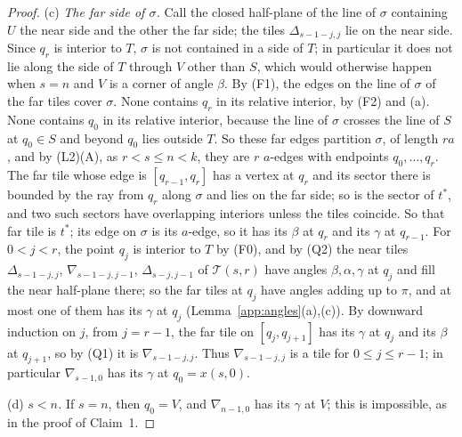 \documentclass[11pt]{amsart}
\theoremstyle{remark}
\begin{document}
\begin{proof}
(c) \emph{The far side of $\sigma$.} Call the closed half-plane of the line of $\sigma$ containing $U$ the near side and the other the far side; the tiles $\Delta_{s-1-j,j}$ lie on the near side. Since $q_r$ is interior to $T$, $\sigma$ is not contained in a side of $T$; in particular it does not lie along the side of $T$ through $V$ other than $S$, which would otherwise happen when $s=n$ and $V$ is a corner of angle $\beta$. By (F1), the edges on the line of $\sigma$ of the far tiles cover $\sigma$. None contains $q_r$ in its relative interior, by (F2) and (a). None contains $q_0$ in its relative interior, because the line of $\sigma$ crosses the line of $S$ at $q_0\in S$ and beyond $q_0$ lies outside $T$. So these far edges partition $\sigma$, of length $ra$, and by (L2)(A), as $r<s\le n<k$, they are $r$ $a$-edges with endpoints $q_0,\dots,q_r$. The far tile whose edge is $[q_{r-1},q_r]$ has a vertex at $q_r$ and its sector there is bounded by the ray from $q_r$ along $\sigma$ and lies on the far side; so is the sector of $t^\ast$, and two such sectors have overlapping interiors unless the tiles coincide. So that far tile is $t^\ast$; its edge on $\sigma$ is its $a$-edge, so it has its $\beta$ at $q_r$ and its $\gamma$ at $q_{r-1}$. For $0<j<r$, the point $q_j$ is interior to $T$ by (F0), and by (Q2) the near tiles $\Delta_{s-1-j,j}$, $\nabla_{s-1-j,j-1}$, $\Delta_{s-j,j-1}$ of $\mathcal{T}(s,r)$ have angles $\beta,\alpha,\gamma$ at $q_j$ and fill the near half-plane there; so the far tiles at $q_j$ have angles adding up to $\pi$, and at most one of them has its $\gamma$ at $q_j$ (Lemma~\ref{app:angles}(a),(c)). By downward induction on $j$, from $j=r-1$, the far tile on $[q_j,q_{j+1}]$ has its $\gamma$ at $q_j$ and its $\beta$ at $q_{j+1}$, so by (Q1) it is $\nabla_{s-1-j,j}$. Thus $\nabla_{s-1-j,j}$ is a tile for $0\le j\le r-1$; in particular $\nabla_{s-1,0}$ has its $\gamma$ at $q_0=x(s,0)$.

(d) \emph{$s<n$.} If $s=n$, then $q_0=V$, and $\nabla_{n-1,0}$ has its $\gamma$ at $V$; this is impossible, as in the proof of Claim~1.


\end{proof}
\end{document}
